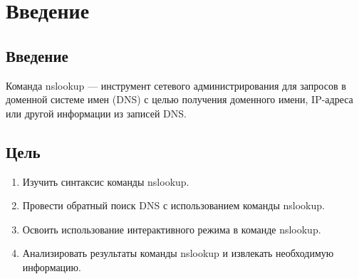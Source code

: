 \chapter{Введение}
\label{ch:intro}

\section{Введение}
Команда nslookup — инструмент сетевого администрирования для запросов в доменной
системе имен (DNS) с целью получения доменного имени, IP-адреса или другой информации из
записей DNS.
 
\section{Цель}  

\begin{enumerate}
    \item Изучить синтаксис команды nslookup.
    \item Провести обратный поиск DNS с использованием команды nslookup.
    \item Освоить использование интерактивного режима в команде nslookup.
    \item Анализировать результаты команды nslookup и извлекать необходимую информацию.
\end{enumerate}

\endinput 